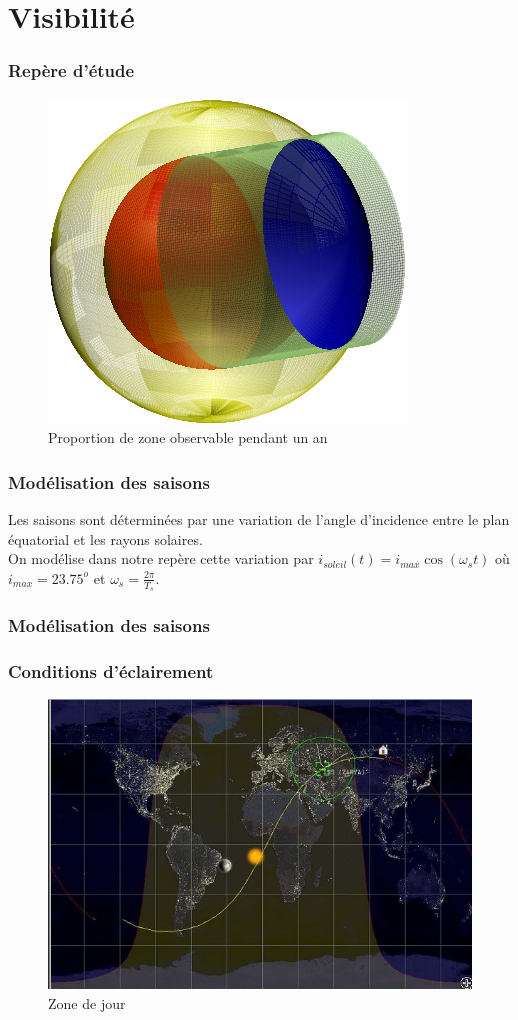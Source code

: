 \documentclass{beamer}
\begin{document}
\section{Visibilité}

\begin{frame}
\frametitle{Repère d'étude}
 \begin{figure}[h]
    \centering
    \includegraphics[width=.6\textwidth]{ombre.pdf}
    \caption{Proportion de zone observable pendant un an}
 \end{figure}
  
\end{frame}

\begin{frame}
\frametitle{Modélisation des saisons}

Les saisons sont déterminées par une variation de l'angle d'incidence entre le plan équatorial et les rayons solaires.\\


On modélise dans notre repère cette variation par $i_{soleil}(t)= i_{max}\cos(\omega_{s}t)$ où $i_{max}=23.75^o$ et $\displaystyle{\omega_s=\frac{2\pi}{T_s}}$.
\end{frame}

\begin{frame}
\frametitle{Modélisation des saisons}
 
\end{frame}

\begin{frame}
\frametitle{Conditions d'éclairement}
  
  \begin{figure}[h]
    \centering
    \includegraphics[width=.6\textwidth]{map2.png}
    \caption{Zone de jour}
 \end{figure}
\end{frame}
\end{document}
